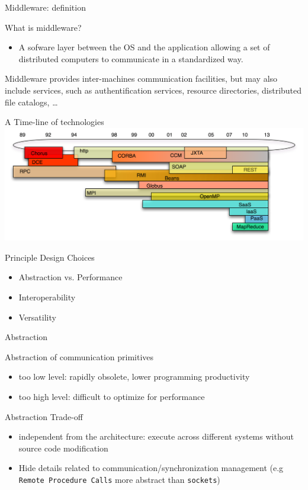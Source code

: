 \documentclass[bigger,hyperref={colorlinks=true, urlcolor=red, plainpages=false, pdfpagelabels, bookmarksnumbered}]{beamer}
\begin{document}
\begin{frame}[label=sec-1-3]{Middleware: definition}
\begin{block}{What is middleware?}
\begin{itemize}
\item A sofware layer between the OS and the application allowing 
a set of distributed computers to communicate in a standardized
way.
\end{itemize}
\end{block}

\begin{block}{Middleware provides inter-machines communication facilities,}
but may also include services, such as authentification services,
resource directories, distributed file catalogs, \ldots{}
\end{block}
\end{frame}

\begin{frame}[label=sec-1-4]{A Time-line of technologies}
\includegraphics[width=.9\linewidth]{../img/timeline.png}
\end{frame}

\begin{frame}[label=sec-1-5]{Principle Design Choices}
\begin{itemize}
\item Abstraction vs. Performance
\item Interoperability
\item Versatility
\end{itemize}
\end{frame}
\begin{frame}[fragile,label=sec-1-6]{Abstraction}
 \begin{block}{Abstraction of communication primitives}
\begin{itemize}
\item too low level: rapidly obsolete, lower programming productivity
\item too high level: difficult to optimize for performance
\end{itemize}
\end{block}
\begin{block}{Abstraction Trade-off}
\begin{itemize}
\item independent from the architecture: execute across
different systems without \alert{source code} modification
\item Hide details related to communication/synchronization management
(e.g \texttt{Remote Procedure Calls} more abstract than \texttt{sockets})
\end{itemize}
\end{block}
\end{frame}
\end{document}
